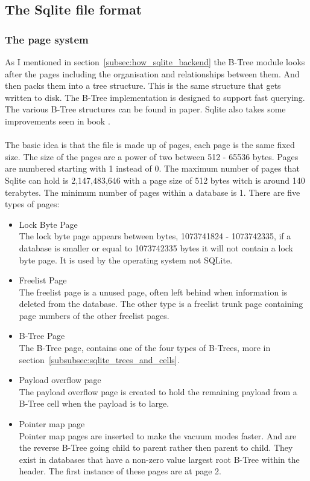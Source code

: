 \subsection{The Sqlite file format}
\label{subsec:sqlite_file_format}

\subsubsection{The page system}
\label{subsubsec:sqlite_page_system}

As I mentioned in section~\ref{subsec:how_sqlite_backend} the B-Tree module looks after the pages including the organisation and relationships between them. And then packs them into a tree structure. This is the same structure that gets written to disk. The B-Tree implementation is designed to support fast querying. The various B-Tree structures can be found in \cite{btreepaper} paper. Sqlite also takes some improvements seen in \cite{btreeimprpaper} book \citep{sqliteray}.
\\\\
The basic idea is that the file is made up of pages, each page is the same fixed size. The size of the pages are a power of two between 512 - 65536 bytes. Pages are numbered starting with 1 instead of 0. The maximum number of pages that Sqlite can hold is 2,147,483,646 with a page size of 512 bytes witch is around 140 terabytes. The minimum number of pages within a database is 1. There are five types of pages:

\begin{itemize} 
	\item Lock Byte Page \hfill \\
		The lock byte page appears between bytes, 1073741824 - 1073742335, if a database is smaller or equal to 1073742335 bytes it will not contain a lock byte page. It is used by the operating system not SQLite.
	
	\item Freelist Page \hfill \\
		The freelist page is a unused page, often left behind when information is deleted from the database. The other type is a freelist trunk page containing page numbers of the other freelist pages.
	
	\item B-Tree Page \hfill \\
		The B-Tree page, contains one of the four types of B-Trees, more in section~\ref{subsubsec:sqlite_trees_and_cells}.
	
	\item Payload overflow page \hfill \\
		The payload overflow page is created to hold the remaining payload from a B-Tree cell when the payload is to large.
	
	\item Pointer map page \hfill \\
		Pointer map pages are inserted to make the vacuum modes faster. And are the reverse B-Tree going child to parent rather then parent to child. They exist in databases that have a non-zero value largest root B-Tree within the header. The first instance of these pages are at page 2. 
\end{itemize} 

